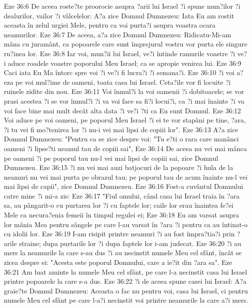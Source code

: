 Eze 36:6  De aceea roste?te proorocie asupra ?arii lui Israel ?i spune mun?ilor ?i dealurilor, vailor ?i vâlcelelor: A?a zice Domnul Dumnezeu: Iata Eu am rostit aceasta în zelul urgiei Mele, pentru ca voi purta?i asupra voastra ocara neamurilor.
Eze 36:7  De aceea, a?a zice Domnul Dumnezeu: Ridicatu-Mi-am mâna cu juramânt, ca popoarele care sunt împrejurul vostru vor purta ele singure ru?inea lor.
Eze 36:8  Iar voi, mun?ii lui Israel, ve?i întinde ramurile voastre ?i ve?i aduce roadele voastre poporului Meu Israel; ca se apropie venirea lui.
Eze 36:9  Caci iata Eu Ma întorc spre voi ?i ve?i fi lucra?i ?i semana?i.
Eze 36:10  ?i voi a?eza pe voi mul?ime de oameni, toata casa lui Israel. Ceta?ile vor fi locuite ?i ruinele zidite din nou.
Eze 36:11  Voi înmul?i la voi oamenii ?i dobitoacele; se vor prasi acestea ?i se vor înmul?i ?i va voi face sa fi?i locui?i, ca ?i mai înainte ?i va voi face bine mai mult decât alta data ?i ve?i ?ti ca Eu sunt Domnul.
Eze 36:12  Voi aduce pe voi oameni, pe poporul Meu Israel ?i ei te vor stapâni pe tine, ?ara, ?i tu vei fi mo?tenirea lor ?i nu-i vei mai lipsi de copiii lor".
Eze 36:13  A?a zice Domnul Dumnezeu: "Pentru ca se zice despre voi: "Tu e?ti o rara care manânci oameni ?i lipse?ti neamul tau de copiii sai",
Eze 36:14  De aceea nu vei mai mânca pe oameni ?i pe poporul tau nu-l vei mai lipsi de copiii sai, zice Domnul Dumnezeu.
Eze 36:15  ?i nu vei mai auzi batjocuri de la popoare ?i hula de la neamuri nu vei mai purta pe obrazul tau; pe poporul tau de acum înainte nu-l vei mai lipsi de capii", zice Domnul Dumnezeu.
Eze 36:16  Fost-a cuvântul Domnului catre mine ?i mi-a zis:
Eze 36:17  "Fiul omului, când casa lui Israel traia în ?ara sa, au pângarit-o cu purtarea lor ?i cu faptele lor; caile lor erau înaintea fe?ei Mele ca necura?enia femeii în timpul regulei ei;
Eze 36:18  Eu am varsat asupra lor mânia Mea pentru sângele pe care l-au varsat în ?ara ?i pentru ca au întinat-o cu idolii lor.
Eze 36:19  I-am risipit printre neamuri ?i au fost împra?tia?i prin ?arile straine; dupa purtarile lor ?i dupa faptele lor i-am judecat.
Eze 36:20  ?i au mers la neamurile la care s-au dus ?i au necinstit numele Meu cel sfânt, încât se zicea despre ei: "Acesta este poporul Domnului, care a ie?it din ?ara sa".
Eze 36:21  Am luat aminte la numele Meu cel sfânt, pe care l-a necinstit casa lui Israel printre popoarele la care s-a dus.
Eze 36:22  ?i de aceea spune casei lui Israel: A?a graie?te Domnul Dumnezeu: Aceasta o fac nu pentru voi, casa lui Israel, ci pentru numele Meu cel sfânt pe care l-a?i necinstit voi printre neamurile la care a?i mers.
